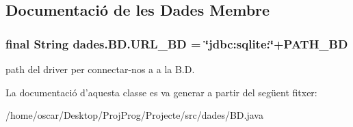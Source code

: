 \subsection{Documentació de les Dades Membre}
\hypertarget{classdades_1_1_b_d_abc83c541acdcd0be2ae8a33daa753077}{
\subsubsection[{U\+R\+L\+\_\+\+B\+D}]{\setlength{\rightskip}{0pt plus 5cm}final String dades.\+B\+D.\+U\+R\+L\+\_\+\+B\+D = \char`\"{}jdbc\+:sqlite\+:\char`\"{}+P\+A\+T\+H\+\_\+\+B\+D\hspace{0.3cm}{\ttfamily [static]}}}\label{classdades_1_1_b_d_abc83c541acdcd0be2ae8a33daa753077}
path del driver per connectar-\/nos a a la B.\+D. 

La documentació d'aquesta classe es va generar a partir del següent fitxer\+:\begin{DoxyCompactItemize}
\item 
/home/oscar/\+Desktop/\+Proj\+Prog/\+Projecte/src/dades/B\+D.\+java\end{DoxyCompactItemize}
